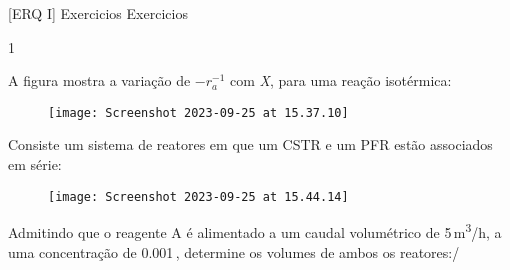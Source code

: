 \documentclass[\mainfilename]{subfiles}
\begin{document}
\graphicspath{{\subfix{./.build/figures/ERQ_I-Exercicios_Resolucoes.1}}}

[ERQ I]
{Exercicios} %
{Exercicios} %

\begin{questionBox}1{ %
    A figura mostra a variação de \(-r_a^{-1}\) com \textit{X}, para uma reação isotérmica:
    \vspace{2ex}
    \begin{center}
        \Large{}
    \end{center}
    \begin{figure}\centering
        \texttt{[image: Screenshot 2023-09-25 at 15.37.10]}
    \end{figure}
    Consiste um sistema de reatores em que um CSTR e um PFR estão associados em série:
    \begin{figure}\centering
        \texttt{[image: Screenshot 2023-09-25 at 15.44.14]}
    \end{figure}
    Admitindo que o reagente A é alimentado a um caudal volumétrico de 5\,\unit{\metre^3/\hour}, a uma concentração de 0.001\,\unit{\molar}, determine os volumes de ambos os reatores:/
} %
\end{questionBox}
\end{document}
